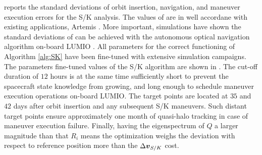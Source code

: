  reports the standard deviations of orbit insertion, navigation, and maneuver execution errors for the S/K analysis. The values of  are in well accordane with existing applications, \eg Artemis \cite{folta2014artemis}. More important, simulations have shown the standard deviations of  can be achieved with the autonomous optical navigation algorithm on-board LUMIO \cite{franzese2017thesis}. All parameters for the correct functioning of Algorithm \ref{alg:SK} have been fine-tuned with extensive simulation campaigns. The parameters fine-tuned values of the S/K algorithm are shown in . The cut-off duration of $12$ hours is at the same time sufficiently short to prevent the spacecraft state knowledge from growing, and long enough to schedule maneuver execution operations on-board LUMIO. The target points are located at $35$ and $42$ days after orbit insertion and any subsequent S/K maneuvers. Such distant target points ensure approximately one month of quasi-halo tracking in case of maneuver execution failure. Finally, having the eigenspectrum of $Q$ a larger magnitude than that $R_i$ means the optimization weighs the deviation with respect to reference position more than the $\Delta\boldsymbol{v}_{S/K}$ cost.

